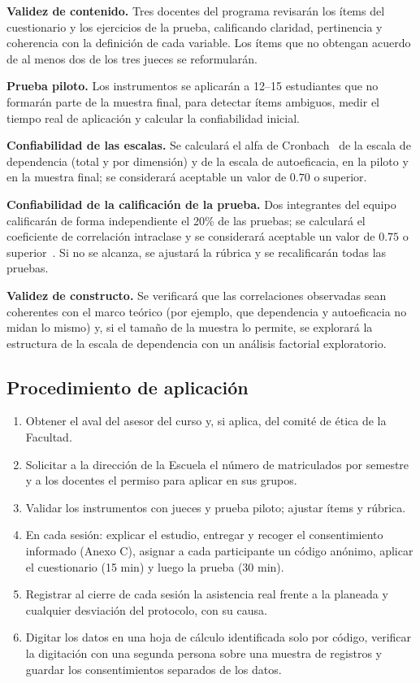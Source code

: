 \documentclass[12pt,letterpaper]{article}
\numberwithin{table}{section}
\numberwithin{figure}{section}
\begin{document}
\textbf{Validez de contenido.} Tres docentes del programa revisarán los ítems del cuestionario y los ejercicios de la prueba, calificando claridad, pertinencia y coherencia con la definición de cada variable. Los ítems que no obtengan acuerdo de al menos dos de los tres jueces se reformularán.

\textbf{Prueba piloto.} Los instrumentos se aplicarán a 12--15 estudiantes que no formarán parte de la muestra final, para detectar ítems ambiguos, medir el tiempo real de aplicación y calcular la confiabilidad inicial.

\textbf{Confiabilidad de las escalas.} Se calculará el alfa de Cronbach~\cite{cronbach1951coefficient} de la escala de dependencia (total y por dimensión) y de la escala de autoeficacia, en la piloto y en la muestra final; se considerará aceptable un valor de $0.70$ o superior.

\textbf{Confiabilidad de la calificación de la prueba.} Dos integrantes del equipo calificarán de forma independiente el 20\% de las pruebas; se calculará el coeficiente de correlación intraclase y se considerará aceptable un valor de $0.75$ o superior~\cite{koo2016guideline}. Si no se alcanza, se ajustará la rúbrica y se recalificarán todas las pruebas.

\textbf{Validez de constructo.} Se verificará que las correlaciones observadas sean coherentes con el marco teórico (por ejemplo, que dependencia y autoeficacia no midan lo mismo) y, si el tamaño de la muestra lo permite, se explorará la estructura de la escala de dependencia con un análisis factorial exploratorio.

\subsection{Procedimiento de aplicación}

\begin{enumerate}
  \item Obtener el aval del asesor del curso y, si aplica, del comité de ética de la Facultad.
  \item Solicitar a la dirección de la Escuela el número de matriculados por semestre y a los docentes el permiso para aplicar en sus grupos.
  \item Validar los instrumentos con jueces y prueba piloto; ajustar ítems y rúbrica.
  \item En cada sesión: explicar el estudio, entregar y recoger el consentimiento informado (Anexo C), asignar a cada participante un código anónimo, aplicar el cuestionario (15 min) y luego la prueba (30 min).
  \item Registrar al cierre de cada sesión la asistencia real frente a la planeada y cualquier desviación del protocolo, con su causa.
  \item Digitar los datos en una hoja de cálculo identificada solo por código, verificar la digitación con una segunda persona sobre una muestra de registros y guardar los consentimientos separados de los datos.
\end{enumerate}
\end{document}
